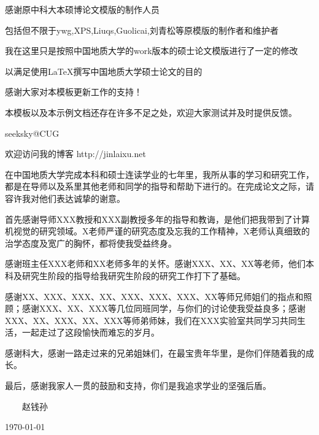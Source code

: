 
\begin{thanks}

感谢原中科大本硕博论文模版的制作人员

包括但不限于ywg,XPS,Liuqs,Guolicai,刘青松等原模版的制作者和维护者

我在这里只是按照中国地质大学的work版本的硕士论文模版进行了一定的修改

以满足使用\LaTeX 撰写中国地质大学硕士论文的目的

感谢大家对本模板更新工作的支持！

本模板以及本示例文档还存在许多不足之处，欢迎大家测试并及时提供反馈。

\begin{flushright}
seeksky@CUG

欢迎访问我的博客 http://jinlaixu.net
\end{flushright}


在中国地质大学完成本科和硕士连读学业的七年里，我所从事的学习和研究工作，都是在导师以及系里其他老师和同学的指导和帮助下进行的。在完成论文之际，请容许我对他们表达诚挚的谢意。

首先感谢导师XXX教授和XXX副教授多年的指导和教诲，是他们把我带到了计算机视觉的研究领域。X老师严谨的研究态度及忘我的工作精神，X老师认真细致的治学态度及宽广的胸怀，都将使我受益终身。

感谢班主任XXX老师和XX老师多年的关怀。感谢XXX、XX、XX等老师，他们本科及研究生阶段的指导给我研究生阶段的研究工作打下了基础。

感谢XX、XXX、XXX、XX、XXX、XXX、XXX、XX等师兄师姐们的指点和照顾；感谢XXX、XX、XXX等几位同班同学，与你们的讨论使我受益良多；感谢XXX、XX、XXX、XX、XXX等师弟师妹，我们在XXX实验室共同学习共同生活，一起走过了这段愉快而难忘的岁月。

感谢科大，感谢一路走过来的兄弟姐妹们，在最宝贵年华里，是你们伴随着我的成长。

最后，感谢我家人一贯的鼓励和支持，你们是我追求学业的坚强后盾。

\vskip 18pt

\begin{flushright}

~~~~赵钱孙~~~~

\today

\end{flushright}

\end{thanks}
